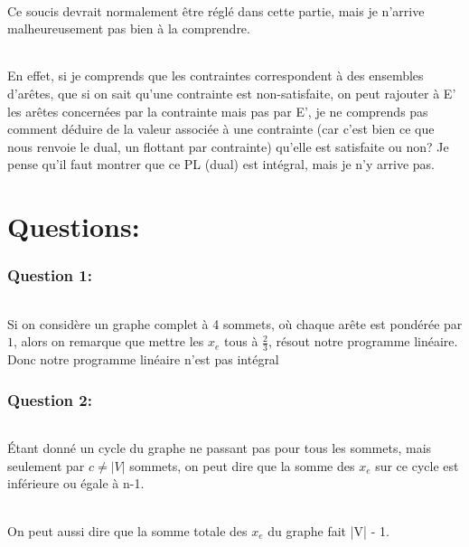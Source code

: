 \documentclass[a4paper]{article}
\begin{document}
\paragraph{}
Ce soucis devrait normalement être réglé dans cette partie, mais je n'arrive malheureusement pas bien à la comprendre.

\paragraph{}
En effet, si je comprends que les contraintes correspondent à des ensembles d'arêtes, que si on sait qu'une contrainte est non-satisfaite, on peut rajouter à E' les arêtes concernées par la contrainte mais pas par E', je ne comprends pas comment déduire de la valeur associée à une contrainte (car c'est bien ce que nous renvoie le dual, un flottant par contrainte) qu'elle est satisfaite ou non? Je pense qu'il faut montrer que ce PL (dual) est intégral, mais je n'y arrive pas.

\part{Questions:}
\section{Question 1:}
\paragraph{}
Si on considère un graphe complet à 4 sommets, où chaque arête est pondérée par $1$, alors on remarque que mettre les $x_{e}$ tous à $\frac{2}{3}$, résout notre programme linéaire. Donc notre programme linéaire n'est pas intégral

\section{Question 2:}
\paragraph{}
Étant donné un cycle du graphe ne passant pas pour tous les sommets, mais seulement par $c \neq |V|$ sommets, on peut dire que la somme des $x_{e}$ sur ce cycle est inférieure ou égale à n-1.

\paragraph{}
On peut aussi dire que la somme totale des $x_{e}$ du graphe fait |V| - 1.
\end{document}
